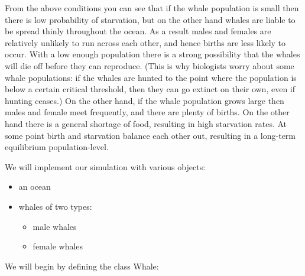 \documentclass[]{book}
\providecommand{\tightlist}{%
  \setlength{\itemsep}{0pt}\setlength{\parskip}{0pt}}
\theoremstyle{definition}
\theoremstyle{definition}
\theoremstyle{remark}
\begin{document}
{From the above conditions you can see that if the whale population is
small then there is low probability of starvation, but on the other hand
whales are liable to be spread thinly throughout the ocean. As a result
males and females are relatively unlikely to run across each other, and
hence births are less likely to occur. With a low enough population
there is a strong possibility that the whales will die off before they
can reproduce. (This is why biologists worry about some whale
populations: if the whales are hunted to the point where the population
is below a certain critical threshold, then they can go extinct on their
own, even if hunting ceases.) On the other hand, if the whale population
grows large then males and female meet frequently, and there are plenty
of births. On the other hand there is a general shortage of food,
resulting in high starvation rates. At some point birth and starvation
balance each other out, resulting in a long-term equilibrium
population-level.

We will implement our simulation with various objects:

\begin{itemize}
\tightlist
\item
  an ocean
\item
  whales of two types:

  \begin{itemize}
  \tightlist
  \item
    male whales
  \item
    female whales
  \end{itemize}
\end{itemize}

We will begin by defining the class Whale:

}
\end{document}
